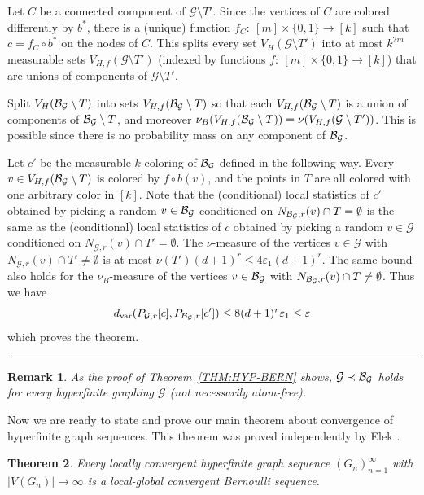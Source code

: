 \documentclass{article}
\newtheorem{theorem}{Theorem}[section]
\newtheorem{remark}[theorem]{Remark}
\newenvironment{proof}{{\bf Proof.}}{\hfill\rule{2mm}{2mm}\medskip}
\def\GG{\mathcal{G}}\def\HH{\mathcal{H}}\def\II{\mathcal{I}}
\def\eps{\varepsilon}
\newcommand{\dvar}{{d_{\mathrm{var}}}}
\begin{document}
\begin{proof}
Let $C$ be a connected component of $\GG\setminus T'$. Since the
vertices of $C$ are colored differently by $b^*$, there is a (unique)
function $f_C:~[m]\times\{0,1\}\to [k]$ such that $c=f_C\circ b^*$ on
the nodes of $C$. This splits every set $V_H(\GG \setminus T')$ into
at most $k^{2m}$ measurable sets $V_{H,f}(\GG \setminus T')$ (indexed
by functions $f:~[m]\times\{0,1\}\to [k]$) that are unions of
components of $\GG\setminus T'$.

Split $V_H(\BB_\GG \setminus T)$ into sets $V_{H,f}(\BB_\GG \setminus
T)$ so that each $V_{H,f}(\BB_\GG \setminus T)$ is a union of
components of $\BB_\GG\setminus T$, and moreover
$\nu_B(V_{H,f}(\BB_\GG \setminus T))=\nu(V_{H,f}(\GG \setminus T'))$.
This is possible since there is no probability mass on any component
of $\BB_\GG$.

Let $c'$ be the  measurable $k$-coloring of $\BB_\GG$ defined in the
following way. Every $v \in V_{H,f}(\BB_\GG \setminus T)$ is colored
by $f \circ b(v)$, and the points in $T$ are all colored with one
arbitrary color in $[k]$. Note that the (conditional) local
statistics of $c'$ obtained by picking a random $v \in \BB_\GG$
conditioned on $N_{\BB_\GG,r}(v) \cap T = \emptyset$ is the same as
the (conditional) local statistics of $c$ obtained by picking a
random $v \in \GG$ conditioned on $N_{\GG,r}(v) \cap T' = \emptyset$.
The $\nu$-measure of the vertices $v \in \GG$ with $N_{\GG,r}(v) \cap
T' \neq \emptyset$ is at most $\nu(T') (d+1)^r \le 4 \eps_1 (d+1)^r$.
The same bound also holds for the $\nu_B$-measure of the vertices $v
\in \BB_\GG$ with $N_{\BB_\GG,r}(v) \cap T \neq \emptyset$. Thus we
have
\[
\dvar(P_{\GG,r}[c],P_{\BB_\GG,r}[c'])\le 8(d+1)^r\eps_1\le\eps
\]
which proves the theorem.
\end{proof}
\begin{remark}
As the proof of Theorem~\ref{THM:HYP-BERN} shows,
$\GG\prec\BB_\GG$ holds for every hyperfinite graphing $\GG$
(not necessarily atom-free).
\end{remark}


Now we are ready to state and prove our main theorem about
convergence of hyperfinite graph sequences. This theorem was proved
independently by Elek \cite{Elek2}.

\begin{theorem}
Every locally convergent hyperfinite graph sequence
$(G_n)_{n=1}^\infty$ with $|V(G_n)| \to \infty$ is a local-global
convergent Bernoulli sequence.
\end{theorem}
\end{document}
